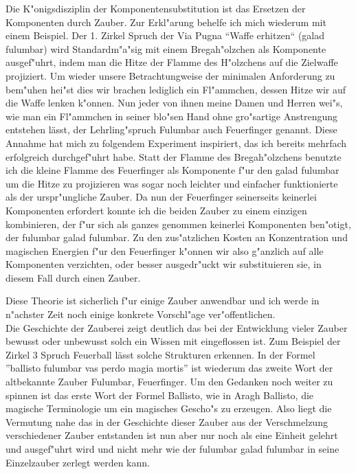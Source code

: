 \documentclass[a5paper,8pt]{book}
\begin{document}
Die K"onigsdisziplin der Komponentensubstitution ist das Ersetzen der Komponenten durch Zauber. Zur Erkl"arung behelfe ich mich wiederum mit einem Beispiel. Der 1. Zirkel 
Spruch der Via Pugna ``Waffe erhitzen`` (galad fulumbar) wird Standardm"a"sig mit einem Bregah"olzchen als Komponente ausgef"uhrt, indem man die Hitze der Flamme des 
H"olzchens auf die Zielwaffe projiziert. Um wieder unsere Betrachtungweise der minimalen Anforderung zu bem"uhen hei"st dies wir brachen lediglich ein Fl"ammchen, dessen 
Hitze wir auf die Waffe lenken k"onnen. Nun jeder von ihnen meine Damen und Herren wei"s, wie man ein Fl"ammchen in seiner blo"sen Hand ohne gro"sartige Anstrengung entstehen 
lässt, der Lehrling"spruch Fulumbar auch Feuerfinger genannt.
Diese Annahme hat mich zu folgendem Experiment inspiriert, das ich bereits mehrfach erfolgreich durchgef"uhrt habe. Statt der Flamme des Bregah"olzchens benutzte ich die 
kleine Flamme des Feuerfinger als Komponente f"ur den galad fulumbar um die Hitze zu projizieren was sogar noch leichter und einfacher funktionierte als der urspr"ungliche 
Zauber. Da nun der Feuerfinger seinerseits keinerlei Komponenten erfordert konnte ich die beiden Zauber zu einem einzigen kombinieren, der f"ur sich als ganzes genommen 
keinerlei Komponenten ben"otigt, der fulumbar galad fulumbar. Zu den zus"atzlichen Kosten an Konzentration und magischen Energien f"ur den Feuerfinger k"onnen wir also 
g"anzlich auf alle Komponenten verzichten, oder besser ausgedr"uckt wir substituieren sie, in diesem Fall durch einen Zauber.

Diese Theorie ist sicherlich f"ur einige Zauber anwendbar und ich werde in n"achster Zeit noch einige konkrete Vorschl"age ver"offentlichen.\\

Die Geschichte der Zauberei zeigt deutlich das bei der Entwicklung vieler Zauber bewusst oder unbewusst solch ein Wissen mit eingeflossen ist. Zum Beispiel der Zirkel 3 
Spruch Feuerball lässt solche Strukturen erkennen. In der Formel ''ballisto fulumbar vas perdo magia mortis'' ist wiederum das zweite Wort der altbekannte Zauber 
Fulumbar, Feuerfinger. Um den Gedanken noch weiter zu spinnen ist das erste Wort der Formel Ballisto, wie in Aragh Ballisto, die magische Terminologie um ein magisches Gescho"s 
zu erzeugen. Also liegt die Vermutung nahe das in der Geschichte dieser Zauber aus der Verschmelzung verschiedener Zauber entstanden ist nun aber nur noch als eine Einheit 
gelehrt und ausgef"uhrt wird und nicht mehr wie der fulumbar galad fulumbar in seine Einzelzauber zerlegt werden kann.
\end{document}
